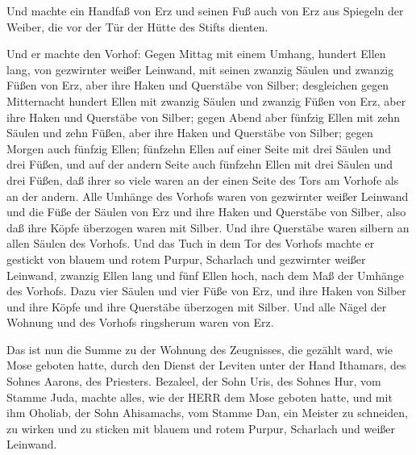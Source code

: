  Und machte ein Handfaß von Erz und seinen Fuß auch von Erz
aus Spiegeln der Weiber, die vor der Tür der Hütte des Stifts dienten.

 Und er machte den Vorhof: Gegen Mittag mit einem Umhang,
hundert Ellen lang, von gezwirnter weißer Leinwand,  mit
seinen zwanzig Säulen und zwanzig Füßen von Erz, aber ihre Haken und
Querstäbe von Silber;  desgleichen gegen Mitternacht
hundert Ellen mit zwanzig Säulen und zwanzig Füßen von Erz, aber ihre
Haken und Querstäbe von Silber;  gegen Abend aber fünfzig
Ellen mit zehn Säulen und zehn Füßen, aber ihre Haken und Querstäbe von
Silber;  gegen Morgen auch fünfzig Ellen; 
fünfzehn Ellen auf einer Seite mit drei Säulen und drei Füßen,
 und auf der andern Seite auch fünfzehn Ellen mit drei
Säulen und drei Füßen, daß ihrer so viele waren an der einen Seite des
Tors am Vorhofe als an der andern.  Alle Umhänge des
Vorhofs waren von gezwirnter weißer Leinwand  und die Füße
der Säulen von Erz und ihre Haken und Querstäbe von Silber, also daß
ihre Köpfe überzogen waren mit Silber. Und ihre Querstäbe waren silbern
an allen Säulen des Vorhofs.  Und das Tuch in dem Tor des
Vorhofs machte er gestickt von blauem und rotem Purpur, Scharlach und
gezwirnter weißer Leinwand, zwanzig Ellen lang und fünf Ellen hoch, nach
dem Maß der Umhänge des Vorhofs.  Dazu vier Säulen und vier
Füße von Erz, und ihre Haken von Silber und ihre Köpfe und ihre
Querstäbe überzogen mit Silber.  Und alle Nägel der Wohnung
und des Vorhofs ringsherum waren von Erz.

 Das ist nun die Summe zu der Wohnung des Zeugnisses, die
gezählt ward, wie Mose geboten hatte, durch den Dienst der Leviten unter
der Hand Ithamars, des Sohnes Aarons, des Priesters. 
Bezaleel, der Sohn Uris, des Sohnes Hur, vom Stamme Juda, machte alles,
wie der HERR dem Mose geboten hatte,  und mit ihm Oholiab,
der Sohn Ahisamachs, vom Stamme Dan, ein Meister zu schneiden, zu wirken
und zu sticken mit blauem und rotem Purpur, Scharlach und weißer
Leinwand.

